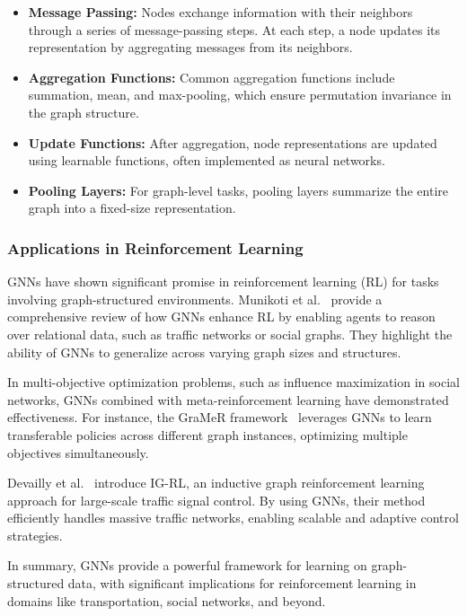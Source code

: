 \documentclass[runningheads]{llncs}
\begin{document}
\begin{itemize}
    \item \textbf{Message Passing:} Nodes exchange information with their neighbors through a series of message-passing steps. At each step, a node updates its representation by aggregating messages from its neighbors.
    \item \textbf{Aggregation Functions:} Common aggregation functions include summation, mean, and max-pooling, which ensure permutation invariance in the graph structure.
    \item \textbf{Update Functions:} After aggregation, node representations are updated using learnable functions, often implemented as neural networks.
    \item \textbf{Pooling Layers:} For graph-level tasks, pooling layers summarize the entire graph into a fixed-size representation.
\end{itemize}

\subsubsection{Applications in Reinforcement Learning}
GNNs have shown significant promise in reinforcement learning (RL) for tasks involving graph-structured environments. Munikoti et al.~\cite{gnndrl:munikoti2022challengesopportunitiesdeepreinforcement} provide a comprehensive review of how GNNs enhance RL by enabling agents to reason over relational data, such as traffic networks or social graphs. They highlight the ability of GNNs to generalize across varying graph sizes and structures.

In multi-objective optimization problems, such as influence maximization in social networks, GNNs combined with meta-reinforcement learning have demonstrated effectiveness. For instance, the GraMeR framework~\cite{gnndrl:munikoti2022gramergraphmetareinforcement} leverages GNNs to learn transferable policies across different graph instances, optimizing multiple objectives simultaneously.

Devailly et al.~\cite{gnndrl:Devailly_2022} introduce IG-RL, an inductive graph reinforcement learning approach for large-scale traffic signal control. By using GNNs, their method efficiently handles massive traffic networks, enabling scalable and adaptive control strategies.

In summary, GNNs provide a powerful framework for learning on graph-structured data, with significant implications for reinforcement learning in domains like transportation, social networks, and beyond.
\end{document}
